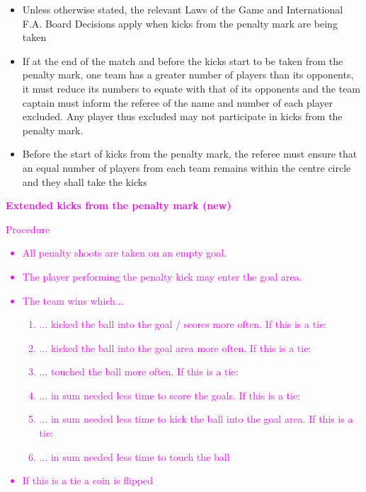 \begin{itemize}
\item Unless otherwise stated, the relevant Laws of the Game and International F.A. Board Decisions apply when kicks from the penalty mark are being taken
\item If at the end of the match and before the kicks start to be taken from the penalty mark, one team has a greater number of players than its opponents, it must reduce its numbers to equate with that of its opponents and the team captain must inform the referee of the name and number of each player excluded. Any player thus excluded may not participate in kicks from the penalty mark.
\item Before the start of kicks from the penalty mark, the referee must ensure that an equal number of players from each team remains within the centre circle and they shall take the kicks
\end{itemize}


\textcolor{magenta}{{\bfseries Extended kicks from the penalty mark (new) }}

\textcolor{magenta}{Procedure}

\headlinebox

\textcolor{magenta}{
\begin{itemize}
\item All penalty shoots are taken on an empty goal.
\item The player performing the penalty kick may enter the goal area.
\item The team wins which...
\begin{enumerate}
\item ... kicked the ball into the goal / scores more often. If this is a tie:
\item ... kicked the ball into the goal area more often. If this is a tie:
\item ... touched the ball more often. If this is a tie:
\item ... in sum needed less time to score the goals. If this is a tie:
\item ... in sum needed less time to kick the ball into the goal area. If this is a tie:
\item ... in sum needed less time to touch the ball
\end{enumerate}
\item If this is a tie a coin is flipped
\end{itemize}
}
